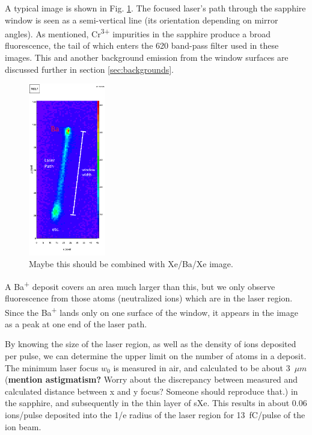 \documentclass[aps,pra,reprint,superscriptaddress]{revtex4-1}
\begin{document}
A typical image is shown in Fig. \ref{fig:image_example}.  The focused laser's path through the sapphire window is seen as a semi-vertical line (its orientation depending on mirror angles).  As mentioned, Cr\textsuperscript{3+} impurities in the sapphire produce a broad fluorescence, the tail of which enters the 620 band-pass filter used in these images.  This and another background emission from the window surfaces are discussed further in section \ref{sec:backgrounds}.

\begin{figure}
\includegraphics[width=0.3\textwidth]{figures/2015-05-26_163_1.png}
\caption{{\color{red}Maybe this should be combined with Xe/Ba/Xe image.}}
\label{fig:image_example}
\end{figure}

A Ba\textsuperscript{+} deposit covers an area much larger than this, but we only observe fluorescence from those atoms (neutralized ions) which are in the laser region.  Since the Ba\textsuperscript{+} lands only on one surface of the window, it appears in the image as a peak at one end of the laser path.

By knowing the size of the laser region, as well as the density of ions deposited per pulse, we can determine the upper limit on the number of atoms in a deposit.  The minimum laser focus $w_0$ is measured in air, and calculated to be about {\color{red}3~$\mu m$ (\textbf{mention astigmatism?} Worry about the discrepancy between measured and calculated distance between x and y focus?  Someone should reproduce that.)} in the sapphire, and subsequently in the thin layer of sXe.  This results in about 0.06 ions/pulse deposited into the 1/e radius of the laser region for 13~fC/pulse of the ion beam.
\end{document}
